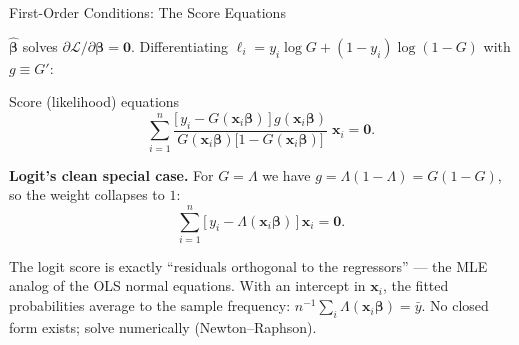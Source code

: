 \documentclass[aspectratio=169, 12pt]{beamer}
\newcommand{\xib}{\mathbf{x}_i\boldsymbol{\beta}}    %
\begin{document}
\begin{frame}[shrink=10]{First-Order Conditions: The Score Equations}

  $\hat{\boldsymbol\beta}$ solves $\partial\mathcal{L}/\partial\boldsymbol\beta=\mathbf{0}$.
  Differentiating $\ell_i = y_i\log G + (1-y_i)\log(1-G)$ with $g\equiv G'$:

  \begin{definitionbox}{Score (likelihood) equations}
    \[
      \sum_{i=1}^{n}
        \frac{\big[\,y_i - G(\xib)\,\big]\,g(\xib)}
             {G(\xib)\big[1-G(\xib)\big]}\;\mathbf{x}_i = \mathbf{0}.
    \]
  \end{definitionbox}

  \smallskip

  \begin{highlightbox}
    \textbf{Logit's clean special case.} For $G=\Lambda$ we have
    $g = \Lambda(1-\Lambda) = G(1-G)$, so the weight collapses to $1$:
    \[
      \sum_{i=1}^{n}\big[\,y_i - \Lambda(\xib)\,\big]\,\mathbf{x}_i = \mathbf{0}.
    \]
  \end{highlightbox}

  \smallskip

  \begin{keybox}
    \small
    The logit score is exactly ``residuals orthogonal to the regressors'' --- the
    MLE analog of the OLS normal equations. With an intercept in $\mathbf{x}_i$,
    the fitted probabilities average to the sample frequency:
    $n^{-1}\sum_i \Lambda(\xib) = \bar y$. No closed form exists; solve numerically
    (Newton--Raphson).
  \end{keybox}

\end{frame}
\end{document}
